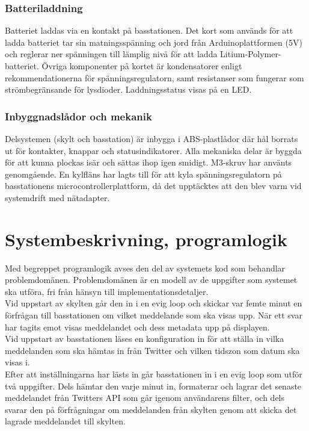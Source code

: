 \documentclass[a4paper,11pt]{article}
\begin{document}
\subsubsection{Batteriladdning}
Batteriet laddas via en kontakt på basstationen. Det kort som används för att ladda batteriet tar sin matningsspänning och jord från Arduinoplattformen (5V) och reglerar ner spänningen till lämplig nivå för att ladda Litium-Polymer-batteriet. Övriga komponenter på kortet är kondensatorer enligt rekommendationerna för spänningsregulatorn, samt resistanser som fungerar som strömbegränsande för lysdioder. Laddningsstatus visas på en LED.

\subsubsection{Inbyggnadslådor och mekanik}
Delsystemen (skylt och basstation) är inbygga i ABS-plastlådor där hål borrats ut för kontakter, knappar och statusindikatorer. Alla mekaniska delar är byggda för att kunna plockas isär och sättas ihop igen smidigt. M3-skruv har använts genomgående. En kylfläns har lagts till för att kyla spänningsregulatorn på basstationens microcontrollerplattform, då det upptäcktes att den blev varm vid systemdrift med nätadapter.

\section{Systembeskrivning, programlogik}
\label{programlogik}
Med begreppet programlogik avses den del av systemets kod som behandlar problemdomänen. Problemdomänen är en modell av de uppgifter som systemet ska utföra, fri från hänsyn till implementationsdetaljer.\\

Vid uppstart av skylten går den in i en evig loop och skickar var femte minut en förfrågan till basstationen om vilket meddelande som ska visas upp. När ett svar har tagits emot visas meddelandet och dess metadata upp på displayen.\\

Vid uppstart av basstationen läses en konfiguration in för att ställa in vilka meddelanden som ska hämtas in från Twitter och vilken tidszon som datum ska visas i.\\

Efter att inställningarna har lästs in går basstationen in i en evig loop som utför två uppgifter. Dels hämtar den varje minut in, formaterar och lagrar det senaste meddelandet från Twitters API som går igenom användarens filter, och dels svarar den på förfrågningar om meddelanden från skylten genom att skicka det lagrade meddelandet till skylten.\\
\end{document}
